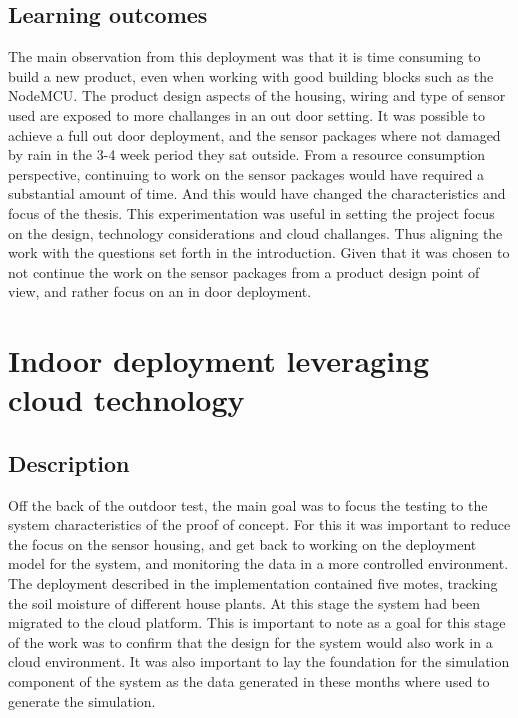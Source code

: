 \documentclass[]{uiophd}
\begin{document}
\subsection{Learning outcomes}
The main observation from this deployment was that it is time consuming to build a new product, even when working with good building blocks such as the NodeMCU. The product design aspects of the housing, wiring and type of sensor used are exposed to more challanges in an out door setting. It was possible to achieve a full out door deployment, and the sensor packages where not damaged by rain in the 3-4 week period they sat outside. From a resource consumption perspective, continuing to work on the sensor packages would have required a substantial amount of time. And this would have changed the characteristics and focus of the thesis. This experimentation was useful in setting the project focus on the design, technology considerations and cloud challanges. Thus aligning the work with the questions set forth in the introduction. Given that it was chosen to not continue the work on the sensor packages from a product design point of view, and rather focus on an in door deployment.

\section{Indoor deployment leveraging cloud technology}

\subsection{Description}
Off the back of the outdoor test, the main goal was to focus the testing to the system characteristics of the proof of concept. For this it was important to reduce the focus on the sensor housing, and get back to working on the deployment model for the system, and monitoring the data in a more controlled environment. The deployment described in the implementation contained five motes, tracking the soil moisture of different house plants. At this stage the system had been migrated to the cloud platform. This is important to note as a goal for this stage of the work was to confirm that the design for the system would also work in a cloud environment. It was also important to lay the foundation for the simulation component of the system as the data generated in these months where used to generate the simulation.
\end{document}
